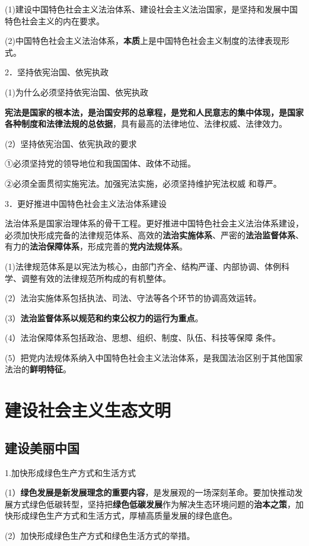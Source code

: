 \documentclass[lang=cn,10pt]{elegantbook}
\begin{document}
	(1)建设中国特色社会主义法治体系、建设社会主义法治国家，是坚持和发展中国特色社会主义的内在要求。
	
	(2)中国特色社会主义法治体系，\textbf{本质}上是中国特色社会主义制度的法律表现形式。
	
	2．坚持依宪治国、依宪执政
	
	(1)为什么必须坚持依宪治国、依宪执政
	
		\textbf{宪法是国家的根本法，是治国安邦的总章程，是党和人民意志的集中体现，是国家各种制度和法律法规的总依据}，具有最高的法律地位、法律权威、法律效力。
		
	(2）坚持依宪治国、依宪执政的要求
	
	①必须坚持党的领导地位和我国国体、政体不动摇。
	
	②必须全面贯彻实施宪法。加强宪法实施，必须坚持维护宪法权威
	和尊严。
	
	3．更好推进中国特色社会主义法治体系建设
	
	法治体系是国家治理体系的骨干工程。更好推进中国特色社会主义法治体系建设，必须加快形成完备的法律规范体系、高效的\textbf{法治实施体系}、严密的\textbf{法治监督体系}、有力的\textbf{法治保障体系}，形成完善的\textbf{党内法规体系}。
	
	(1)法律规范体系是以宪法为核心，由部门齐全、结构严谨、内部协调、体例科学、调整有效的法律规范所构成的有机整体。
	
	(2）法治实施体系包括执法、司法、守法等各个环节的协调高效运转。
	
	(3）\textbf{法治监督体系以规范和约束公权力的运行为重点}。
	
	(4）法治保障体系包括政治、思想、组织、制度、队伍、科技等保障
	条件。
	
	(5）把党内法规体系纳入中国特色社会主义法治体系，是我国法治区别于其他国家法治的\textbf{鲜明特征}。
	\chapter{建设社会主义生态文明}
	\section{建设美丽中国}
	
	1.加快形成绿色生产方式和生活方式
	
	(1）\textbf{绿色发展是新发展理念的重要内容}，是发展观的一场深刻革命。要加快推动发展方式绿色低碳转型，坚持把\textbf{绿色低碳发展}作为解决生态环境问题的\textbf{治本之策}，加快形成绿色生产方式和生活方式，厚植高质量发展的绿色底色。
	
	(2）加快形成绿色生产方式和绿色生活方式的举措。
	
\end{document}
